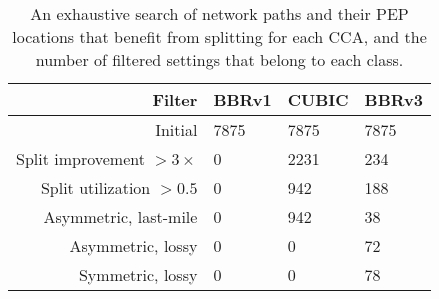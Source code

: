 \begin{table}[t!]
  \centering
\begin{tabular}{ r l l l }
  \toprule
    \textbf{Filter} & \textbf{BBRv1} & \textbf{CUBIC} & \textbf{BBRv3} \\
    \midrule
    Initial & 7875 & 7875 & 7875 \\
    Split improvement $>3\times$ & 0 & 2231 & 234 \\
    Split utilization $>0.5$ & 0 & 942 & 188 \\
    \midrule
    Asymmetric, last-mile & 0 & 942 & 38 \\
    Asymmetric, lossy & 0 & 0 & 72 \\
    Symmetric, lossy & 0 & 0 & 78 \\
    \bottomrule
\end{tabular}
  \caption{\label{tab:network-path-analysis} An exhaustive search of network
   paths and their PEP locations that benefit from splitting for each CCA, and
   the number of filtered settings that belong to each class.}
\end{table}
